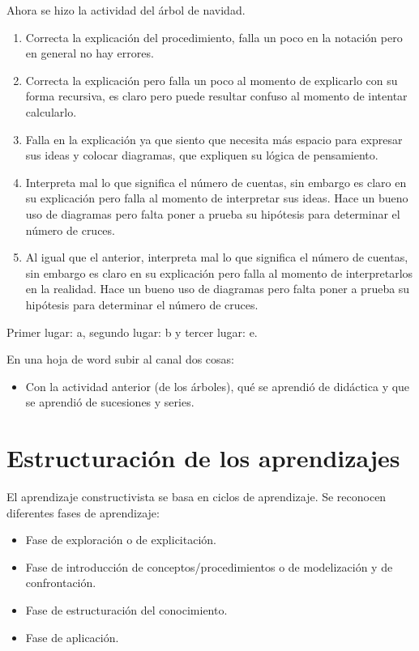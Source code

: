 \documentclass[12pt]{report}
\newcounter{it}
\theoremstyle{largebreak}
\begin{document}
    Ahora se hizo la actividad del árbol de navidad.

    \renewcommand{\theenumi}{\alph{enumi}}

    \begin{enumerate}
        \item Correcta la explicación del procedimiento, falla un poco en la notación pero en general no hay errores.
        \item Correcta la explicación pero falla un poco al momento de explicarlo con su forma recursiva, es claro pero puede resultar confuso al momento de intentar calcularlo.
        \item Falla en la explicación ya que siento que necesita más espacio para expresar sus ideas y colocar diagramas, que expliquen su lógica de pensamiento.
        \item Interpreta mal lo que significa el número de cuentas, sin embargo es claro en su explicación pero falla al momento de interpretar sus ideas. Hace un bueno uso de diagramas pero falta poner a prueba su hipótesis para determinar el número de cruces.
        \item Al igual que el anterior, interpreta mal lo que significa el número de cuentas, sin embargo es claro en su explicación pero falla al momento de interpretarlos en la realidad. Hace un bueno uso de diagramas pero falta poner a prueba su hipótesis para determinar el número de cruces.
    \end{enumerate}

    Primer lugar: a, segundo lugar: b y tercer lugar: e.

    \begin{excer}
        En una hoja de word subir al canal dos cosas:
        \begin{itemize}
            \item Con la actividad anterior (de los árboles), qué se aprendió de didáctica y que se aprendió de sucesiones y series.
        \end{itemize}
    \end{excer}

    \section{Estructuración de los aprendizajes}

    El aprendizaje constructivista se basa en ciclos de aprendizaje. Se reconocen diferentes fases de aprendizaje:
    \begin{itemize}
        \item Fase de exploración o de explicitación.
        \item Fase de introducción de conceptos/procedimientos o de modelización y de confrontación.
        \item Fase de estructuración del conocimiento.
        \item Fase de aplicación.
    \end{itemize}
\end{document}
